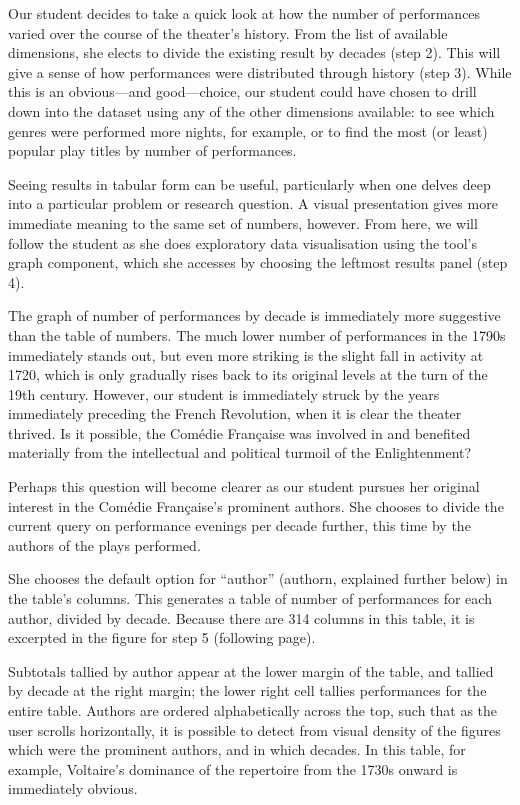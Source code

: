 \documentclass[	DIV=calc,%
							paper=a4,%
							fontsize=11pt,%
							twocolumn]{scrartcl}	 					%
\begin{document}
Our student decides to take a quick look at how the number of performances varied over the course of the theater’s history.  From the list of available dimensions, she elects to divide the existing result by decades (step 2).  This will give a sense of how performances were distributed through history (step 3).  While this is an obvious—and good—choice, our student could have chosen to drill down into the dataset using any of the other dimensions available: to see which genres were performed more nights, for example, or to find the most (or least) popular play titles by number of performances.

Seeing results in tabular form can be useful, particularly when one delves deep into a particular problem or research question.  A visual presentation gives more immediate meaning to the same set of numbers, however.  From here, we will follow the student as she does exploratory data visualisation using the tool’s graph component, which she accesses by choosing the leftmost results panel (step 4).

The graph of number of performances by decade is immediately more suggestive than the table of numbers.  The much lower number of performances in the 1790s immediately stands out, but even more striking is the slight fall in activity at 1720, which is only gradually rises back to its original levels at the turn of the 19th century.  However, our student is immediately struck by the years immediately preceding the French Revolution, when it is clear the theater thrived.  Is it possible, the Comédie Française was involved in and benefited materially from the intellectual and political turmoil of the Enlightenment?

Perhaps this question will become clearer as our student pursues her original interest in the Comédie Française’s prominent authors.  She chooses to divide the current query on performance evenings per decade further, this time by the authors of the plays performed.

She chooses the default option for ``author'' (authorn, explained further below) in the table’s columns.  This generates a table of number of performances for each author, divided by decade.  Because there are 314 columns in this table, it is excerpted in the figure for step 5 (following page).

Subtotals tallied by author appear at the lower margin of the table, and tallied by decade at the right margin; the lower right cell tallies performances for the entire table.  Authors are ordered alphabetically across the top, such that as the user scrolls horizontally, it is possible to detect from visual density of the figures which were the prominent authors, and in which decades.  In this table, for example, Voltaire’s dominance of the repertoire from the 1730s onward is immediately obvious.
\end{document}

